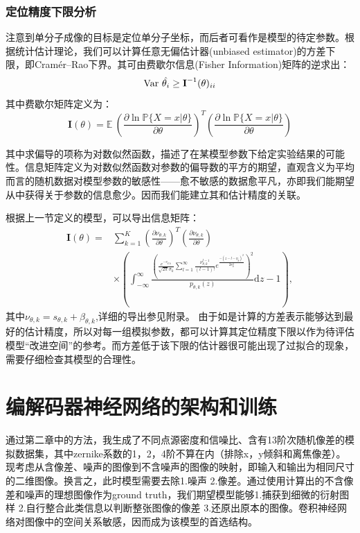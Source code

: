 \documentclass[draft=false,oneside]{fduthesis}
\begin{document}
    \subsection{定位精度下限分析}
    注意到单分子成像的目标是定位单分子坐标，而后者可看作是模型的待定参数。根据统计估计理论，我们可以计算任意无偏估计器(unbiased estimator)的方差下限，即Cramér–Rao下界。其可由费歇尔信息(Fisher Information)矩阵的逆求出：
    \begin{equation}
        \textup{Var}\ \hat{\theta_i} \geq \textbf{I}^{-1}(\theta)_{ii}
    \end{equation}
    其中费歇尔矩阵定义为：
    \begin{equation}
        \textbf{I}(\theta)=\mathbb{E}\ (\frac{\partial \ln \mathbb{P}\{X=x|\theta\}}{\partial \theta})^{T}(\frac{\partial \ln \mathbb{P}\{X=x|\theta\}}{\partial \theta})
    \end{equation}
    \par 其中求偏导的项称为对数似然函数，描述了在某模型参数下给定实验结果的可能性。信息矩阵定义为对数似然函数对参数的偏导数的平方的期望，直观含义为平均而言的随机数据对模型参数的敏感性——愈不敏感的数据愈平凡，亦即我们能期望从中获得关于参数的信息愈少。因而我们能建立其和估计精度的关联。
    \par 根据上一节定义的模型，可以导出信息矩阵：
    \begin{equation}
        \begin{aligned}\mathbf{I}(\theta)= & \sum_{k=1}^{K}\left(\frac{\partial \nu_{\theta, k}}{\partial \theta}\right)^{T}\left(\frac{\partial \nu_{\theta, k}}{\partial \theta}\right) \\& \times\left(\int_{-\infty}^{\infty} \frac{\left(\frac{e^{-v_{\theta, k}}}{\sqrt{2 \pi} \sigma_{k}} \sum_{l=1}^{\infty} \frac{\nu_{\theta, k}^{l-1}}{(l-1)!} e^{\frac{-\left(z-l-\eta_{k}\right)^{2}}{2 \sigma_{k}^{2}}}\right)^{2}}{p_{\theta, k}(z)} \mathrm{d} z-1\right),\end{aligned}
    \end{equation}
    其中$\nu_{\theta, k}=s_{\theta,k}+\beta_{\theta,k}$,详细的导出参见附录。
    由于如是计算的方差表示能够达到最好的估计精度，所以对每一组模拟参数，都可以计算其定位精度下限以作为待评估模型“改进空间”的参考。而方差低于该下限的估计器很可能出现了过拟合的现象，需要仔细检查其模型的合理性。
    
    \chapter{编解码器神经网络的架构和训练}
    通过第二章中的方法，我生成了不同点源密度和信噪比、含有13阶次随机像差的模拟数据集，其中zernike系数的1，2，4阶不算在内（排除x，y倾斜和离焦像差）。现考虑从含像差、噪声的图像到不含噪声的图像的映射，即输入和输出为相同尺寸的二维图像。换言之，此时模型需要去除1.噪声 2.像差。通过使用计算出的不含像差和噪声的理想图像作为ground truth，我们期望模型能够1.捕获到细微的衍射图样 2.自行整合此类信息以判断整张图像的像差 3.还原出原本的图像。卷积神经网络对图像中的空间关系敏感，因而成为该模型的首选结构。
\end{document}
